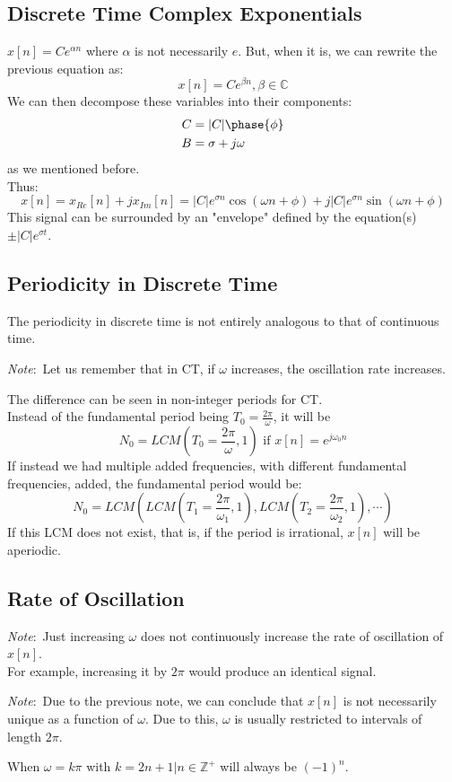 \documentclass[nobib]{tufte-handout}
\newcommand{\note}[1]{
        \begin{notebox}
        \noindent\textit{Note}:\ #1
        \end{notebox}
}
\begin{document}
\subsection{Discrete Time Complex Exponentials}
$x[n] = Ce^{\alpha n}$ where $\alpha$ is not necessarily $e$.
But, when it is, we can rewrite the previous equation as:
\begin{equation*}
    x[n]=Ce^{\beta n}, \beta\in\mathbb{C}
\end{equation*}
We can then decompose these variables into their components:
\begin{align*}
    C &= |C|\phase{\phi}\\
    B &= \sigma + j\omega
\end{align*}
as we mentioned before.\\
Thus:
\begin{equation*}
    x[n] = x_{Re}[n]+jx_{Im}[n] = |C|e^{\sigma n}\cos(\omega n+\phi)+j|C|e^{\sigma n}\sin(\omega n+\phi)
\end{equation*}
This signal can be surrounded by an "envelope" defined by the equation(s) $\pm |C|e^{\sigma t}$.
\subsection{Periodicity in Discrete Time}
The periodicity in discrete time is not entirely analogous to that of continuous time.
\note{Let us remember that in CT, if $\omega$ increases, the oscillation rate increases.}
The difference can be seen in non-integer periods for CT.\\
Instead of the fundamental period being $T_0=\frac{2\pi}{\omega}$, it will be
\begin{equation*}
    N_0 = LCM(T_0=\frac{2\pi}{\omega},1) \text{ if } x[n] = e^{j\omega_0 n}
\end{equation*}
If instead we had multiple added frequencies, with different fundamental frequencies, added, the fundamental period would be:
\begin{equation*}
    N_0 = LCM(LCM(T_1=\frac{2\pi}{\omega_1},1), LCM(T_2=\frac{2\pi}{\omega_2},1), \cdots)
\end{equation*}
If this LCM does not exist, that is, if the period is irrational, $x[n]$ will be aperiodic.
\subsection{Rate of Oscillation}
\note{Just increasing $\omega$ does not continuously increase the rate of oscillation of $x[n]$. \\For example, increasing  it by $2\pi$ would produce an identical signal.}
\note{Due to the previous note, we can conclude that $x[n]$ is not necessarily unique as a function of $\omega$. Due to this, $\omega$ is usually restricted to intervals of length $2\pi$.}
When $\omega=k\pi$ with $k = 2n+1 | n\in\mathbb{Z}^+$ will always be $(-1)^n$.
\end{document}
